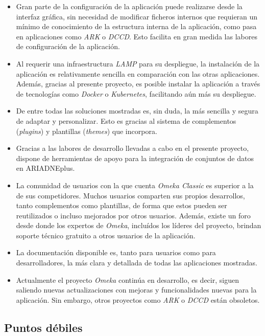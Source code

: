 \documentclass[
]{article}
\providecommand{\tightlist}{%
  \setlength{\itemsep}{0pt}\setlength{\parskip}{0pt}}
\begin{document}
\begin{itemize}
\tightlist
\item
  Gran parte de la configuración de la aplicación puede realizarse desde
  la interfaz gráfica, sin necesidad de modificar ficheros internos que
  requieran un mínimo de conocimiento de la estructura interna de la
  aplicación, como pasa en aplicaciones como \emph{ARK} o \emph{DCCD}.
  Esto facilita en gran medida las labores de configuración de la
  aplicación.
\item
  Al requerir una infraestructura \emph{LAMP} para su despliegue, la
  instalación de la aplicación es relativamente sencilla en comparación
  con las otras aplicaciones. Además, gracias al presente proyecto, es
  posible instalar la aplicación a través de tecnologías como
  \emph{Docker} o \emph{Kubernetes}, facilitando aún más su despliegue.
\item
  De entre todas las soluciones mostradas es, sin duda, la más sencilla
  y segura de adaptar y personalizar. Esto es gracias al sistema de
  complementos (\emph{plugins}) y plantillas (\emph{themes}) que
  incorpora.
\item
  Gracias a las labores de desarrollo llevadas a cabo en el presente
  proyecto, dispone de herramientas de apoyo para la integración de
  conjuntos de datos en ARIADNEplus.
\item
  La comunidad de usuarios con la que cuenta \emph{Omeka Classic} es
  superior a la de sus competidores. Muchos usuarios comparten sus
  propios desarrollos, tanto complementos como plantillas, de forma que
  estos pueden ser reutilizados o incluso mejorados por otros usuarios.
  Además, existe un foro desde donde los expertos de \emph{Omeka},
  incluídos los líderes del proyecto, brindan soporte técnico gratuito a
  otros usuarios de la aplicación.
\item
  La documentación disponible es, tanto para usuarios como para
  desarrolladores, la más clara y detallada de todas las aplicaciones
  mostradas.
\item
  Actualmente el proyecto \emph{Omeka} continúa en desarrollo, es decir,
  siguen saliendo nuevas actualizaciones con mejoras y funcionalidades
  nuevas para la aplicación. Sin embargo, otros proyectos como
  \emph{ARK} o \emph{DCCD} están obsoletos.
\end{itemize}

\hypertarget{puntos-duxe9biles}{%
\subsection{Puntos débiles}\label{puntos-duxe9biles}}
\end{document}
